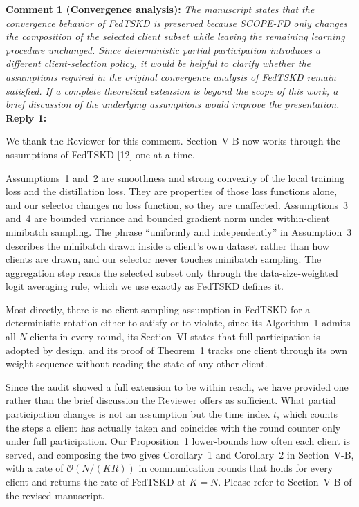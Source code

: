 \documentclass[10pt]{article}
\begin{document}
\noindent
\textbf{Comment 1 (Convergence analysis):} \textit{The manuscript states that the convergence behavior of FedTSKD is preserved because SCOPE-FD only changes the composition of the selected client subset while leaving the remaining learning procedure unchanged. Since deterministic partial participation introduces a different client-selection policy, it would be helpful to clarify whether the assumptions required in the original convergence analysis of FedTSKD remain satisfied. If a complete theoretical extension is beyond the scope of this work, a brief discussion of the underlying assumptions would improve the presentation.} \\
\noindent
\textbf{Reply 1:} {We thank the Reviewer for this comment. Section~V-B now works through the assumptions of FedTSKD [12] one at a time.

Assumptions~1 and~2 are smoothness and strong convexity of the local training loss and the distillation loss. They are properties of those loss functions alone, and our selector changes no loss function, so they are unaffected. Assumptions~3 and~4 are bounded variance and bounded gradient norm under within-client minibatch sampling. The phrase ``uniformly and independently'' in Assumption~3 describes the minibatch drawn inside a client's own dataset rather than how clients are drawn, and our selector never touches minibatch sampling. The aggregation step reads the selected subset only through the data-size-weighted logit averaging rule, which we use exactly as FedTSKD defines it.

Most directly, there is no client-sampling assumption in FedTSKD for a deterministic rotation either to satisfy or to violate, since its Algorithm~1 admits all $N$ clients in every round, its Section~VI states that full participation is adopted by design, and its proof of Theorem~1 tracks one client through its own weight sequence without reading the state of any other client.

Since the audit showed a full extension to be within reach, we have provided one rather than the brief discussion the Reviewer offers as sufficient. What partial participation changes is not an assumption but the time index $t$, which counts the steps a client has actually taken and coincides with the round counter only under full participation. Our Proposition~1 lower-bounds how often each client is served, and composing the two gives Corollary~1 and Corollary~2 in Section~V-B, with a rate of $\mathcal{O}(N/(KR))$ in communication rounds that holds for every client and returns the rate of FedTSKD at $K=N$. Please refer to Section~V-B of the revised manuscript.}\\
\end{document}
